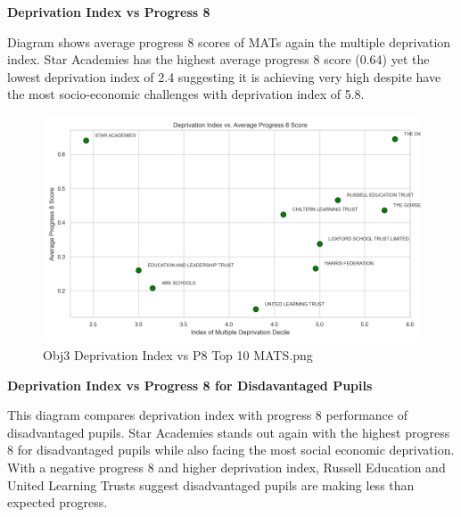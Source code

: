 \documentclass[
  letterpaper,
  DIV=11,
  numbers=noendperiod]{scrartcl}
\begin{document}
\textbf{Deprivation Index vs Progress 8}

Diagram shows average progress 8 scores of MATs again the multiple
deprivation index. Star Academies has the highest average progress 8
score (0.64) yet the lowest deprivation index of 2.4 suggesting it is
achieving very high despite have the most socio-economic challenges with
deprivation index of 5.8.

\begin{figure}[H]

{\centering \includegraphics{images/Obj3_Deprivation Index vs P8 top 10 MATS.png}

}

\caption{Obj3 Deprivation Index vs P8 Top 10 MATS.png}

\end{figure}%

\textbf{Deprivation Index vs Progress 8 for Disdavantaged Pupils}

This diagram compares deprivation index with progress 8 performance of
disadvantaged pupils. Star Academies stands out again with the highest
progress 8 for disadvantaged pupils while also facing the most social
economic deprivation. With a negative progress 8 and higher deprivation
index, Russell Education and United Learning Trusts suggest
disadvantaged pupils are making less than expected progress.
\end{document}
